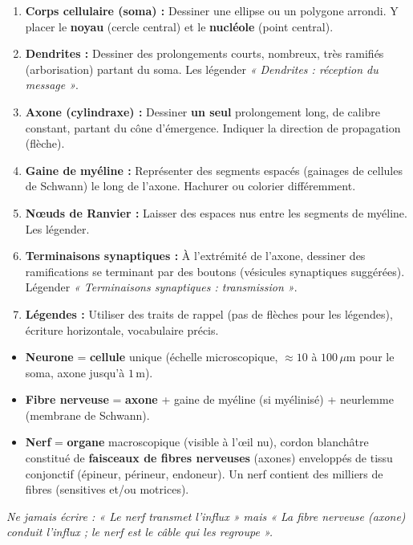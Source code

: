 \documentclass[11pt]{article}
\begin{document}
\begin{methode}
\begin{enumerate}
    \item \textbf{Corps cellulaire (soma) :} Dessiner une ellipse ou un polygone arrondi. Y placer le \textbf{noyau} (cercle central) et le \textbf{nucléole} (point central).
    \item \textbf{Dendrites :} Dessiner des prolongements courts, nombreux, très ramifiés (arborisation) partant du soma. Les légender \emph{« Dendrites : réception du message »}.
    \item \textbf{Axone (cylindraxe) :} Dessiner \textbf{un seul} prolongement long, de calibre constant, partant du cône d'émergence. Indiquer la direction de propagation (flèche).
    \item \textbf{Gaine de myéline :} Représenter des segments espacés (gainages de cellules de Schwann) le long de l'axone. Hachurer ou colorier différemment.
    \item \textbf{Nœuds de Ranvier :} Laisser des espaces nus entre les segments de myéline. Les légender.
    \item \textbf{Terminaisons synaptiques :} À l'extrémité de l'axone, dessiner des ramifications se terminant par des boutons (vésicules synaptiques suggérées). Légender \emph{« Terminaisons synaptiques : transmission »}.
    \item \textbf{Légendes :} Utiliser des traits de rappel (pas de flèches pour les légendes), écriture horizontale, vocabulaire précis.
\end{enumerate}
\end{methode}

\begin{attention}
\begin{itemize}
    \item \textbf{Neurone} = \textbf{cellule} unique (échelle microscopique, $\approx 10$ à $100\,\mu\text{m}$ pour le soma, axone jusqu'à $1\,\text{m}$).
    \item \textbf{Fibre nerveuse} = \textbf{axone} + gaine de myéline (si myélinisé) + neurlemme (membrane de Schwann).
    \item \textbf{Nerf} = \textbf{organe} macroscopique (visible à l'œil nu), cordon blanchâtre constitué de \textbf{faisceaux de fibres nerveuses} (axones) enveloppés de tissu conjonctif (épineur, périneur, endoneur). Un nerf contient des milliers de fibres (sensitives et/ou motrices).
\end{itemize}
\emph{Ne jamais écrire : « Le nerf transmet l'influx » mais « La fibre nerveuse (axone) conduit l'influx ; le nerf est le câble qui les regroupe ».}
\end{attention}
\end{document}
